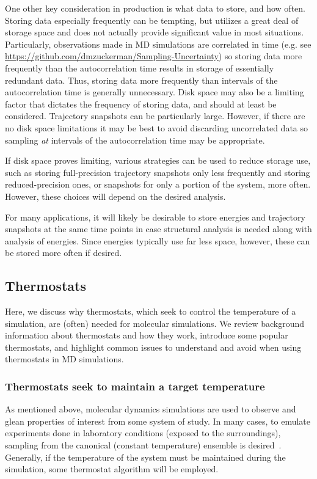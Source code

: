\documentclass[9pt,bestpractices]{livecoms}
\begin{document}
One other key consideration in production is what data to store, and how often.
Storing data especially frequently can be tempting, but utilizes a great deal of storage space and does not actually provide significant value in most situations.
Particularly, observations made in MD simulations are correlated in time (e.g. see \url{https://github.com/dmzuckerman/Sampling-Uncertainty}) so storing data more frequently than the autocorrelation time results in storage of essentially redundant data.
Thus, storing data more frequently than intervals of the autocorrelation time is generally unnecessary.
Disk space may also be a limiting factor that dictates the frequency of storing data, and should at least be considered.
Trajectory snapshots can be particularly large.
However, if there are no disk space limitations it may be best to avoid discarding uncorrelated data so sampling \emph{at} intervals of the autocorrelation time may be appropriate.

If disk space proves limiting, various strategies can be used to reduce storage use, such as storing full-precision trajectory snapshots only less frequently and storing reduced-precision ones, or snapshots for only a portion of the system, more often.
However, these choices will depend on the desired analysis.

For many applications, it will likely be desirable to store energies and trajectory snapshots at the same time points in case structural analysis is needed along with analysis of energies.
Since energies typically use far less space, however, these can be stored more often if desired.

\subsection{Thermostats}
\label{sec:thermostats}

Here, we discuss why thermostats, which seek to control the temperature of a simulation, are (often) needed for molecular simulations.
We review background information about thermostats and how they work, introduce some popular thermostats, and highlight common issues to understand and avoid when using thermostats in MD simulations.

\subsubsection{Thermostats seek to maintain a target temperature}
As mentioned above, molecular dynamics simulations are used to observe and glean properties of interest from some system of study.
In many cases, to emulate experiments done in laboratory conditions (exposed to the surroundings), sampling from the canonical (constant temperature) ensemble is desired~\cite{thermostatAlgorithms2005}.
Generally, if the temperature of the system must be maintained during the simulation, some thermostat algorithm will be employed.
\end{document}
